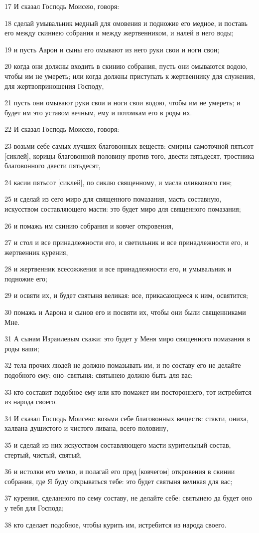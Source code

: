 \par 17 И сказал Господь Моисею, говоря:
\par 18 сделай умывальник медный для омовения и подножие его медное, и поставь его между скиниею собрания и между жертвенником, и налей в него воды;
\par 19 и пусть Аарон и сыны его омывают из него руки свои и ноги свои;
\par 20 когда они должны входить в скинию собрания, пусть они омываются водою, чтобы им не умереть; или когда должны приступать к жертвеннику для служения, для жертвоприношения Господу,
\par 21 пусть они омывают руки свои и ноги свои водою, чтобы им не умереть; и будет им это уставом вечным, ему и потомкам его в роды их.
\par 22 И сказал Господь Моисею, говоря:
\par 23 возьми себе самых лучших благовонных веществ: смирны самоточной пятьсот [сиклей], корицы благовонной половину против того, двести пятьдесят, тростника благовонного двести пятьдесят,
\par 24 касии пятьсот [сиклей], по сиклю священному, и масла оливкового гин;
\par 25 и сделай из сего миро для священного помазания, масть составную, искусством составляющего масти: это будет миро для священного помазания;
\par 26 и помажь им скинию собрания и ковчег откровения,
\par 27 и стол и все принадлежности его, и светильник и все принадлежности его, и жертвенник курения,
\par 28 и жертвенник всесожжения и все принадлежности его, и умывальник и подножие его;
\par 29 и освяти их, и будет святыня великая: все, прикасающееся к ним, освятится;
\par 30 помажь и Аарона и сынов его и посвяти их, чтобы они были священниками Мне.
\par 31 А сынам Израилевым скажи: это будет у Меня миро священного помазания в роды ваши;
\par 32 тела прочих людей не должно помазывать им, и по составу его не делайте подобного ему; оно--святыня: святынею должно быть для вас;
\par 33 кто составит подобное ему или кто помажет им постороннего, тот истребится из народа своего.
\par 34 И сказал Господь Моисею: возьми себе благовонных веществ: стакти, ониха, халвана душистого и чистого ливана, всего половину,
\par 35 и сделай из них искусством составляющего масти курительный состав, стертый, чистый, святый,
\par 36 и истолки его мелко, и полагай его пред [ковчегом] откровения в скинии собрания, где Я буду открываться тебе: это будет святыня великая для вас;
\par 37 курения, сделанного по сему составу, не делайте себе: святынею да будет оно у тебя для Господа;
\par 38 кто сделает подобное, чтобы курить им, истребится из народа своего.


